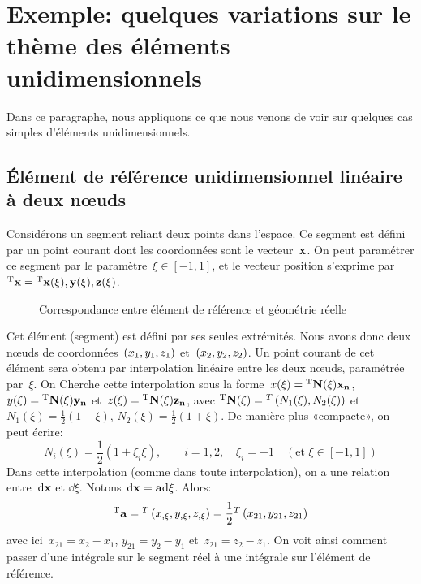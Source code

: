 \section{Exemple: quelques variations sur le thème des éléments unidimensionnels}

Dans ce paragraphe, nous appliquons ce que nous venons de voir sur quelques cas simples d'éléments unidimensionnels.

\medskipvm
\subsection{Élément de référence unidimensionnel linéaire à deux nœuds}\label{Sec-Elt1D2}

Considérons un segment reliant deux points dans l'espace. Ce segment est défini par un point courant dont les coordonnées sont le vecteur~$\VV{x}$. On peut paramétrer ce segment par le paramètre~$\xi \in [-1,1]$, et le vecteur position s'exprime par~${}^\mathrm{T}\mathbf{x}={}^\mathrm{T}\mathbf{x(\xi), y(\xi), z(\xi)}$.
\begin{figure}[ht]\centering\small
    \hspace{5em}
   \caption{Correspondance entre élément de référence et géométrie réelle}\label{fig-e1rr}
\end{figure}
\medskipvm
Cet élément (segment) est défini par ses seules extrémités. Nous avons donc deux nœuds de coordonnées~$\left(x_1, y_1, z_1\right)$ et~$\left(x_2, y_2, z_2\right)$.
\medskipvm
Un point courant de cet élément sera obtenu par interpolation linéaire entre les deux nœuds, paramétrée par~$\xi$. On Cherche cette interpolation sous la forme~$x(\xi)=\LL{N(\xi)}\VV{x_n}$, $y(\xi)=\LL{N(\xi)}\VV{y_n}$ et~$z(\xi)=\LL{N(\xi)}\VV{z_n}$, avec
${}^\mathrm{T}\mathbf{N(\xi)}={}^T\left( N_1(\xi), N_2(\xi)\right)$ et~$N_1(\xi)=\frac12 (1-\xi)$, $N_2(\xi)=\frac12(1+\xi)$.
De manière plus «compacte», on peut écrire:
\begin{equation} N_i(\xi)=\frac12(1+\xi_i\xi), \qquad i=1,2, \quad \xi_i=\pm1 \quad (\text{et } \xi\in[-1,1]) \end{equation}
\medskipvm
Dans cette interpolation (comme dans toute interpolation), on a une relation entre~$\dd\VV{x}$ et $\dd\xi$. Notons~$\dd\VV{x} = \VV{a} \dd \xi$. Alors:
\begin{equation} {}^\mathrm{T}\mathbf{a} = {}^T\left( x_{,\xi}, y_{,\xi}, z_{,\xi}\right) = \frac12 {}^T\left( x_{21}, y_{21}, z_{21}\right)\end{equation}
avec ici~$x_{21}=x_2-x_1$, $y_{21}=y_2-y_1$ et~$z_{21}=z_2-z_1$.
On voit ainsi comment passer d'une intégrale sur le segment réel à une intégrale sur l'élément de référence.

